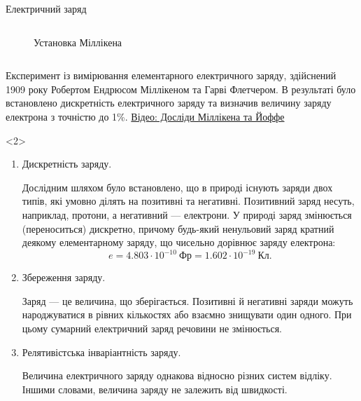 \documentclass{beamer}
\begin{document}
\begin{frame}{Електричний заряд}
\begin{onlyenv}
\begin{columns}
\begin{column}{0.4\linewidth}
\begin{figure}
					\caption{Установка Міллікена}
				\end{figure}
			\end{column}
		\end{columns}
		\begin{block}{}\justifying
			Експеримент із вимірювання елементарного електричного заряду,
			здійснений 1909 року Робертом Ендрюсом Міллікеном та Гарві
			Флетчером. В результаті було встановлено дискретність електричного
			заряду та визначив величину заряду електрона з точністю до 1\%.
			\href{https://www.youtube.com/watch?v=5LC4-ct_1-M}{Відео: Досліди Міллікена та Йоффе}
		\end{block}
	\end{onlyenv}

	\begin{onlyenv}
		\begin{enumerate}\justifying
			\item Дискретність заряду.

			      \begin{flushleft}\small
				      Дослідним шляхом було встановлено, що в природі існують \alert{заряди двох типів}, які умовно ділять на \alert{позитивні} та
				      \alert{негативні}. Позитивний заряд несуть, наприклад, протони, а негативний --- електрони. У природі заряд змінюється (переноситься)
				      дискретно, причому будь-який ненульовий заряд кратний деякому елементарному заряду, що чисельно дорівнює заряду електрона:
				      \begin{equation*}
					      e = 4.803 \cdot 10^{-10}\ \text{Фр} = 1.602 \cdot 10^{-19}\ \text{Кл}.
				      \end{equation*}
			      \end{flushleft}

			\item Збереження заряду.

			      \begin{flushleft}\small
				      Заряд --- це величина, що \alert{зберігається}. Позитивні й негативні заряди можуть народжуватися в рівних кількостях або взаємно
				      знищувати один одного. При цьому сумарний електричний заряд речовини не змінюється.
			      \end{flushleft}
			\item Релятивістська інваріантність заряду.

			      \begin{flushleft}\small
				      Величина електричного заряду однакова відносно різних систем відліку. Іншими словами, величина заряду не залежить від швидкості.
			      \end{flushleft}
		\end{enumerate}
	\end{onlyenv}
\end{frame}
\end{document}
